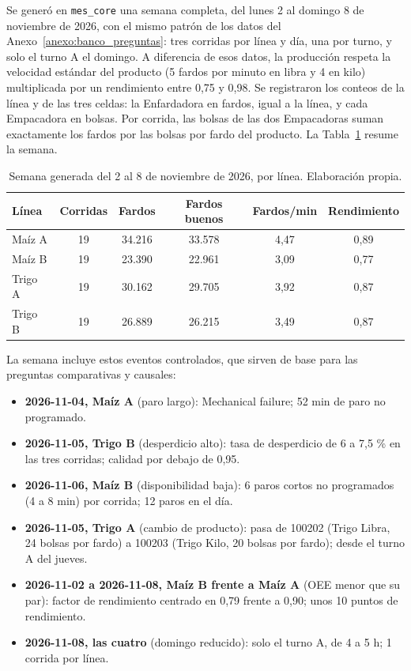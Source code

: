 \begin{singlespace}
Se generó en \texttt{mes\_core} una semana completa, del lunes 2 al domingo 8 de noviembre de 2026, con el mismo patrón de los datos del Anexo~\ref{anexo:banco_preguntas}: tres corridas por línea y día, una por turno, y solo el turno A el domingo. A diferencia de esos datos, la producción respeta la velocidad estándar del producto (5 fardos por minuto en libra y 4 en kilo) multiplicada por un rendimiento entre 0,75 y 0,98. Se registraron los conteos de la línea y de las tres celdas: la Enfardadora en fardos, igual a la línea, y cada Empacadora en bolsas. Por corrida, las bolsas de las dos Empacadoras suman exactamente los fardos por las bolsas por fardo del producto. La Tabla~\ref{tab:anexoc_semana} resume la semana.

\begin{table}[H]
\centering
\caption{Semana generada del 2 al 8 de noviembre de 2026, por línea. Elaboración propia.}
\label{tab:anexoc_semana}
\small
\renewcommand{\arraystretch}{1.3}
\begin{tabular}{lccccc}
\hline
\textbf{Línea} & \textbf{Corridas} & \textbf{Fardos} & \textbf{Fardos buenos} & \textbf{Fardos/min} & \textbf{Rendimiento} \\
\hline
Maíz A & 19 & 34.216 & 33.578 & 4,47 & 0,89 \\
Maíz B & 19 & 23.390 & 22.961 & 3,09 & 0,77 \\
Trigo A & 19 & 30.162 & 29.705 & 3,92 & 0,87 \\
Trigo B & 19 & 26.889 & 26.215 & 3,49 & 0,87 \\
\hline
\end{tabular}
\end{table}

La semana incluye estos eventos controlados, que sirven de base para las preguntas comparativas y causales:

\begin{itemize}
\item \textbf{2026-11-04, Maíz A} (paro largo): Mechanical failure; 52 min de paro no programado.
\item \textbf{2026-11-05, Trigo B} (desperdicio alto): tasa de desperdicio de 6 a 7,5 \% en las tres corridas; calidad por debajo de 0,95.
\item \textbf{2026-11-06, Maíz B} (disponibilidad baja): 6 paros cortos no programados (4 a 8 min) por corrida; 12 paros en el día.
\item \textbf{2026-11-05, Trigo A} (cambio de producto): pasa de 100202 (Trigo Libra, 24 bolsas por fardo) a 100203 (Trigo Kilo, 20 bolsas por fardo); desde el turno A del jueves.
\item \textbf{2026-11-02 a 2026-11-08, Maíz B frente a Maíz A} (OEE menor que su par): factor de rendimiento centrado en 0,79 frente a 0,90; unos 10 puntos de rendimiento.
\item \textbf{2026-11-08, las cuatro} (domingo reducido): solo el turno A, de 4 a 5 h; 1 corrida por línea.
\end{itemize}


\end{singlespace}
